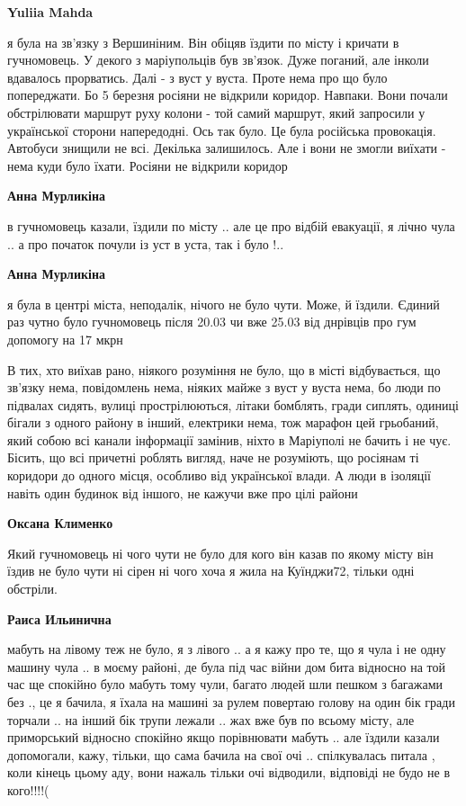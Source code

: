 \begin{itemize} %
\textbf{Yuliia Mahda} 

я була на зв'язку з Вершиніним. Він обіцяв їздити по місту і кричати в
гучномовець. У декого з маріупольців був зв'язок. Дуже поганий, але інколи
вдавалось прорватись. Далі - з вуст у вуста. Проте нема про що було
попереджати. Бо 5 березня росіяни не відкрили коридор. Навпаки. Вони почали
обстрілювати маршрут руху колони - той самий маршрут, який запросили у
української сторони напередодні. Ось так було. Це була російська провокація.
Автобуси знищили не всі. Декілька залишилось. Але і вони не змогли виїхати -
нема куди було їхати. Росіяни не відкрили коридор

\textbf{Анна Мурликіна} 

в гучномовець казали, їздили по місту .. але це про відбій евакуації, я лічно
чула .. а про початок почули із уст в уста, так і було !..

\textbf{Анна Мурликіна}

я була в центрі міста, неподалік, нічого не було чути. Може, й їздили. Єдиний
раз чутно було гучномовець після 20.03 чи вже 25.03 від днрівців про гум
допомогу на 17 мкрн


В тих, хто виїхав рано, ніякого розуміння не було, що в місті відбувається, що
зв'язку нема, повідомлень нема, ніяких майже з вуст у вуста нема, бо люди по
підвалах сидять, вулиці прострілюються, літаки бомблять, гради сиплять, одиниці
бігали з одного району в інший, електрики нема, тож марафон цей грьобаний, який
собою всі канали інформації замінив, ніхто в Маріуполі не бачить і не чує.
Бісить, що всі причетні роблять вигляд, наче не розуміють, що росіянам ті
коридори до одного місця, особливо від української влади. А люди в ізоляції
навіть один будинок від іншого, не кажучи вже про цілі райони

\textbf{Оксана Клименко} 

Який гучномовець ні чого чути не було для кого він казав по якому місту він
їздив не було чути ні сірен ні чого хоча я жила на Куїнджи72, тільки одні
обстріли.

\textbf{Раиса Ильинична} 

мабуть на лівому теж не було, я з лівого .. а я кажу про те, що я чула і не
одну машину чула .. в моєму районі, де була під час війни дом бита відносно на
той час ще спокійно було мабуть тому чули, багато людей шли пешком з багажами
без ., це я бачила, я їхала на машині за рулем повертаю голову на один бік
гради торчали .. на інший бік трупи лежали .. жах вже був по всьому місту, але
приморський відносно спокійно якщо порівнювати мабуть .. але їздили казали
допомогали, кажу, тільки, що сама бачила на свої очі .. спілкувалась питала
, коли кінець цьому аду, вони нажаль тільки очі відводили, відповіді не будо
не в кого!!!!(


\end{itemize}
